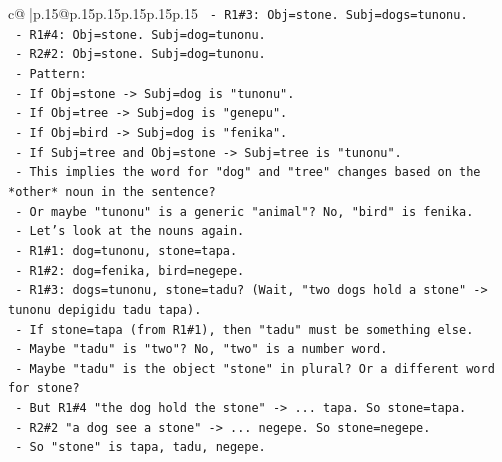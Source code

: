 \documentclass{article}
\begin{document}
{\begin{supertabular}{c@{$\;$}|p{.15\linewidth}@{}p{.15\linewidth}p{.15\linewidth}p{.15\linewidth}p{.15\linewidth}p{.15\linewidth}}
{{{\texttt{                            {-} R1\#3: Obj=stone. Subj=dogs=tunonu.} \\
\texttt{                            {-} R1\#4: Obj=stone. Subj=dog=tunonu.} \\
\texttt{                            {-} R2\#2: Obj=stone. Subj=dog=tunonu.} \\
\texttt{                          {-} Pattern:} \\
\texttt{                            {-} If Obj=stone {-}> Subj=dog is "tunonu".} \\
\texttt{                            {-} If Obj=tree {-}> Subj=dog is "genepu".} \\
\texttt{                            {-} If Obj=bird {-}> Subj=dog is "fenika".} \\
\texttt{                            {-} If Subj=tree and Obj=stone {-}> Subj=tree is "tunonu".} \\
\texttt{                          {-} This implies the word for "dog" and "tree" changes based on the *other* noun in the sentence?} \\
\texttt{                          {-} Or maybe "tunonu" is a generic "animal"? No, "bird" is fenika.} \\
\texttt{                          {-} Let's look at the nouns again.} \\
\texttt{                            {-} R1\#1: dog=tunonu, stone=tapa.} \\
\texttt{                            {-} R1\#2: dog=fenika, bird=negepe.} \\
\texttt{                            {-} R1\#3: dogs=tunonu, stone=tadu? (Wait, "two dogs hold a stone" {-}> tunonu depigidu tadu tapa).} \\
\texttt{                              {-} If stone=tapa (from R1\#1), then "tadu" must be something else.} \\
\texttt{                              {-} Maybe "tadu" is "two"? No, "two" is a number word.} \\
\texttt{                              {-} Maybe "tadu" is the object "stone" in plural? Or a different word for stone?} \\
\texttt{                              {-} But R1\#4 "the dog hold the stone" {-}> ... tapa. So stone=tapa.} \\
\texttt{                              {-} R2\#2 "a dog see a stone" {-}> ... negepe. So stone=negepe.} \\
\texttt{                              {-} So "stone" is tapa, tadu, negepe.} \\
}}}
\end{supertabular}}
\end{document}
